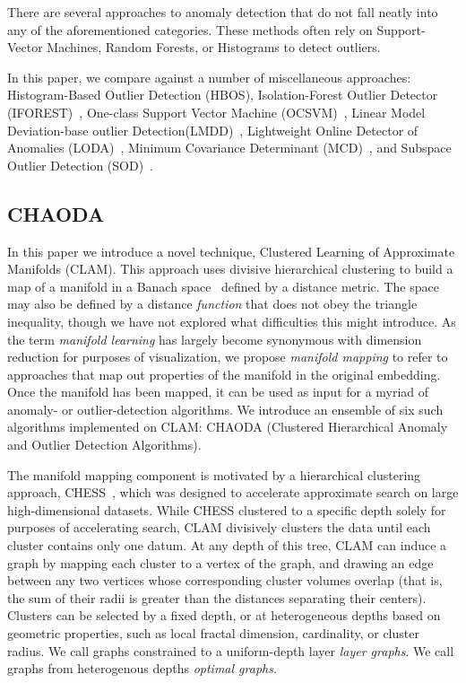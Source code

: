 There are several approaches to anomaly detection that do not fall neatly into any of the aforementioned categories.
These methods often rely on Support-Vector Machines, Random Forests, or Histograms to detect outliers.

In this paper, we compare against a number of miscellaneous approaches:
Histogram-Based Outlier Detection (HBOS)\cite{goldstein2012histogram},
Isolation-Forest Outlier Detector (IFOREST)~\cite{tony2008iforest,tony2012iforest},
One-class Support Vector Machine (OCSVM)~\cite{sholkopf2001ocsvm},
Linear Model Deviation-base outlier Detection(LMDD)~\cite{arning1996linear},
Lightweight Online Detector of Anomalies (LODA)~\cite{pevny2016loda},
Minimum Covariance Determinant (MCD)~\cite{rousseeuw1999mcd,hardin2004mcd},
and Subspace Outlier Detection (SOD)~\cite{kriegel2009sod}.


\subsection{CHAODA}
\label{subsec:introduction:chaoda}

In this paper we introduce a novel technique, Clustered Learning of Approximate Manifolds (CLAM).
This approach uses divisive hierarchical clustering to build a map of a manifold in a Banach space~\cite{banach1929fonctionnelles} defined by a distance metric.
The space may also be defined by a distance \textit{function} that does not obey the triangle inequality, though we have not explored what difficulties this might introduce.
As the term \emph{manifold learning} has largely become synonymous with dimension reduction for purposes of visualization, we propose \emph{manifold mapping} to refer to approaches that map out properties of the manifold in the original embedding.
Once the manifold has been mapped, it can be used as input for a myriad of anomaly- or outlier-detection algorithms.
We introduce an ensemble of six such algorithms implemented on CLAM: CHAODA (Clustered Hierarchical Anomaly and Outlier Detection Algorithms).

The manifold mapping component is motivated by a hierarchical clustering approach, CHESS~\cite{ishaq2019clustered}, which was designed to accelerate approximate search on large high-dimensional datasets.
While CHESS clustered to a specific depth solely for purposes of accelerating search, CLAM
divisively clusters the data until each cluster contains only one datum.
At any depth of this tree, CLAM can induce a graph by mapping each cluster to a vertex of the graph, and drawing an edge between any two vertices whose corresponding cluster volumes overlap (that is, the sum of their radii is greater than the distances separating their centers).
Clusters can be selected by a fixed depth, or at heterogeneous depths based on geometric properties, such as local fractal dimension, cardinality, or cluster radius.
We call graphs constrained to a uniform-depth layer \textit{layer graphs}.
We call graphs from heterogenous depths \textit{optimal graphs}.


